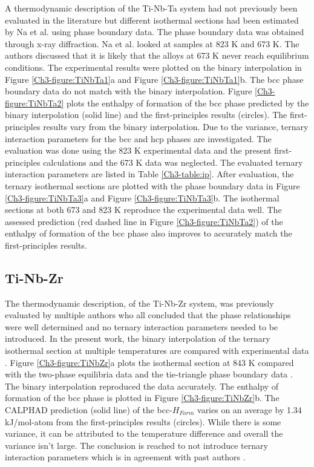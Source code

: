 A thermodynamic description of the Ti-Nb-Ta system had not previously been evaluated in the literature but different isothermal sections had been estimated by Na et al. \cite{Na2001} using phase boundary data. The phase boundary data was obtained through x-ray diffraction. Na et al. \cite{Na2001} looked at samples at 823 K and 673 K. The authors \cite{Na2001} discussed that it is likely that the alloys at 673 K never reach equilibrium conditions. The experimental results \cite{Na2001} were plotted on the binary interpolation in Figure \ref{Ch3-figure:TiNbTa1}a and Figure \ref{Ch3-figure:TiNbTa1}b. The bcc phase boundary data do not match with the binary interpolation. Figure \ref{Ch3-figure:TiNbTa2} plots the enthalpy of formation of the bcc phase predicted by the binary interpolation (solid line) and the first-principles results (circles). The first-principles results vary from the binary interpolation. Due to the variance, ternary interaction parameters for the bcc and hcp phases are investigated. The evaluation was done using the 823 K experimental data and the present first-principles calculations and the 673 K data was neglected. The evaluated ternary interaction parameters are listed in Table \ref{Ch3-table:ip}. After evaluation, the ternary isothermal sections are plotted with the phase boundary data in Figure \ref{Ch3-figure:TiNbTa3}a and Figure \ref{Ch3-figure:TiNbTa3}b. The isothermal sections at both 673 and 823 K reproduce the experimental data \cite{Na2001} well. The assessed prediction (red dashed line in Figure \ref{Ch3-figure:TiNbTa2}) of the enthalpy of formation of the bcc phase also improves to accurately match the first-principles results.

\subsection{Ti-Nb-Zr}

The thermodynamic description, of the Ti-Nb-Zr system, was previously evaluated by multiple authors \cite{Kumar1994a,Tokunaga2007} who all concluded that the phase relationships were well determined and no ternary interaction parameters needed to be introduced. In the present work, the binary interpolation of the ternary isothermal section at multiple temperatures are compared with experimental data \cite{Kumar1994a,Tokunaga2007}. Figure \ref{Ch3-figure:TiNbZr}a plots the isothermal section at 843 K compared with the two-phase equilibria data and the tie-triangle phase boundary data \cite{Tokunaga2007}. The binary interpolation reproduced the data accurately. The enthalpy of formation of the bcc phase is plotted in Figure \ref{Ch3-figure:TiNbZr}b. The CALPHAD prediction (solid line) of the bcc-$H_{Form}$ varies on an average by 1.34 kJ/mol-atom from the first-principles results (circles). While there is some variance, it can be attributed to the temperature difference and overall the variance isn't large. The conclusion is reached to not introduce ternary interaction parameters which is in agreement with past authors \cite{Kumar1994a,Tokunaga2007}.  

